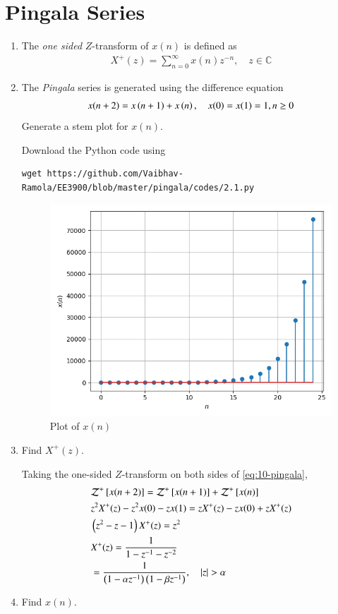 \documentclass[journal,12pt,twocolumn]{IEEEtran}
\renewcommand\thesection{\arabic{section}}
\begin{document}
\section{Pingala Series}
\begin{enumerate}[label=\thesection.\arabic*,ref=\thesection.\theenumi]
\item The {\em one sided} $Z$-transform of $x(n)$ is defined as 
\begin{align}
	X^{+}(z) = \sum_{n = 0}^{\infty}x(n)z^{-n}, \quad z \in \mathbb{C}
	\label{eq:one-Z}
\end{align}
\item The {\em Pingala} series is generated using the difference equation 
\begin{align}
	x(n+2) = x\left(n+1\right) + x\left(n\right),  \quad x(0) = x(1) = 1, n \ge 0
	\label{eq:10-pingala}
\end{align}
Generate a stem plot for $x(n)$.

\solution
Download the Python code using
\begin{lstlisting}
wget https://github.com/Vaibhav-Ramola/EE3900/blob/master/pingala/codes/2.1.py
\end{lstlisting}

\begin{figure}[!htp]
	\includegraphics[width=\columnwidth]{./figs/2_1}
	\caption{Plot of $x(n)$}
	\label{fig:xn}
\end{figure}

\newpage
\item Find $X^{+}(z)$.

\solution Taking the one-sided $Z$-transform on both sides of \eqref{eq:10-pingala},
\begin{align}
	&\mathcal{Z}^+{}\left[x(n + 2)\right] = \mathcal{Z}^+{}\left[x(n + 1)\right] + \mathcal{Z}^+{}\left[x(n)\right] \\
	&z^2X^+(z) - z^2x(0) - zx(1) = zX^+(z) - zx(0) + zX^+(z) \\
	&\left(z^2 - z - 1\right)X^+(z) = z^2 \\
	&X^+(z) = \frac{1}{1 - z^{-1} - z^{-2}} \\
	&= \frac{1}{\left(1 - \alpha z^{-1}\right)\left(1 - \beta z^{-1}\right)}, \quad |z| > \alpha
	\label{eq:X-z}
\end{align}
\item Find $x(n)$.


\end{enumerate}
\end{document}
